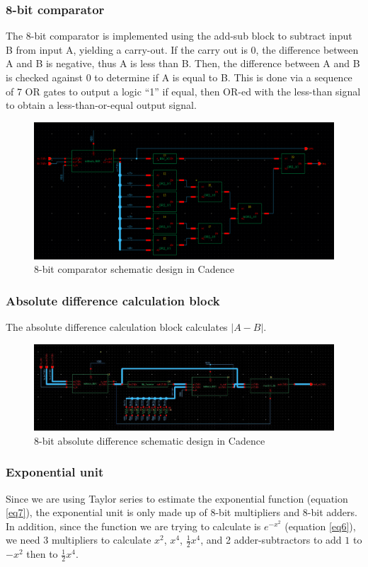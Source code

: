 \documentclass[letterpaper, 11pt]{article}
\begin{document}
	
	\subsubsection{8-bit comparator}
	The 8-bit comparator is implemented using the add-sub block to subtract input B from input A, yielding a carry-out. If the carry out is 0, the difference between A and B is negative, thus A is less than B. Then, the difference between A and B is checked against 0 to determine if A is equal to B. This is done via a sequence of 7 OR gates to output a logic “1” if equal, then OR-ed with the less-than signal to obtain a less-than-or-equal output signal.
	
	\begin{figure}[htb!]
		\centering
		\includegraphics[width=0.85\linewidth]{report_pics/comp8b_schem.png}
		\caption{8-bit comparator schematic design in Cadence}
		\label{fig8}
	\end{figure}
	
	\newpage
	
	\subsubsection{Absolute difference calculation block}
	The absolute difference calculation block calculates $|A - B|$.
	
	\begin{figure}[htb!]
		\centering
		\includegraphics[width=0.85\linewidth]{report_pics/abs_8b_schem.jpg}
		\caption{8-bit absolute difference schematic design in Cadence}
		\label{fig9}
	\end{figure}
	
	
	\subsubsection{Exponential unit}
	Since we are using Taylor series to estimate the exponential function (equation \ref{eq7}), the exponential unit is only made up of 8-bit multipliers and 8-bit adders. In addition, since the function we are trying to calculate is $e^{-x^2}$ (equation \ref{eq6}), we need 3 multipliers to calculate $x^2$, $x^4$, $\frac{1}{2}x^4$, and 2 adder-subtractors to add $1$ to  $- x^2$ then to $ \frac{1}{2}x^4$.
	
\end{document}

